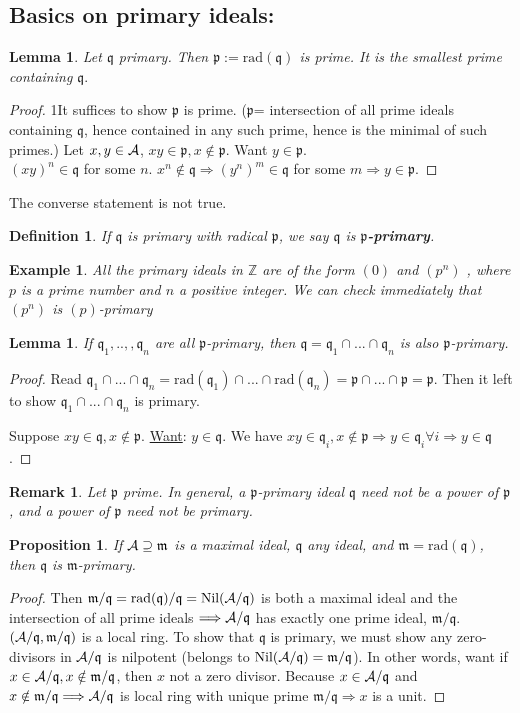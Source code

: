 \documentclass[11pt]{article}
\newtheorem{prop}[thm]{Proposition}
\newtheorem{lemma}[thm]{Lemma}
\newtheorem{dfn}[thm]{Definition}
\newtheorem{rmk}[thm]{Remark}
\newtheorem{ex}[thm]{Example}
\newcommand{\intg}{\mathbb Z}
\newcommand{\scm}{{\mathfrak m}}
\newcommand{\scp}{{\mathfrak p}}
\newcommand{\scq}{\mathfrak q}
\newcommand{\cala}{{\cal A}}
\newcommand{\Lrta}{\Longrightarrow}
\begin{document}
\subsection*{Basics on primary ideals:}
\begin{lemma}
Let $\scq$ primary. Then $\scp:=\text{rad}(\scq)$ is prime. It is the smallest prime containing $\scq.$
\end{lemma}
\begin{proof}
1It suffices to show $\scp$ is prime. ($\scp$= intersection of all prime ideals containing $\scq$, hence contained in any such prime, hence is the minimal of such primes.) Let $x,y\in\cala$, $xy\in\scp,x\notin \scp$. Want $y\in\scp$.\\
 $(xy)^n\in\scq$ for some $n$. $x^n\notin\scq\Lrta (y^n)^m\in\scq $ for some $m$$\Lrta  y\in\scp$.
\end{proof}

The converse statement is not true.
\begin{dfn}
If $\scq$ is primary with radical $\scp$, we say $\scq$ is  \textbf{$\scp$-primary}.
\end{dfn}
\begin{ex}
All the primary ideals in $\intg$ are of the form $(0)$ and $(p^n)$ , where $p$ is a prime number and $n$ a positive integer. We can check immediately that $(p^n)$ is $(p)$-primary
\end{ex}
\begin{lemma}
If $\scq_1,..,,\scq_n$ are all $\scp$-primary, then $\scq=\scq_1\cap...\cap \scq_n$ is also $\scp$-primary.
\end{lemma}
\begin{proof}
Read $\scq_1\cap...\cap\scq_n=\text{rad}(\scq_1)\cap...\cap \text{rad}(\scq_n)=\scp\cap...\cap \scp=\scp$. Then it left to show $\scq_1\cap...\cap\scq_n$ is primary. 

Suppose $xy\in\scq, x\notin \scp$. \underline{Want}: $y\in \scq$. We have $xy\in \scq_i,x\notin\scp\Lrta y\in \scq_i\forall i\Lrta y\in\scq$.
\end{proof}
\begin{rmk}
Let $\scp$ prime. In general, a $\scp$-primary ideal $\scq$ need not be a power of $\scp$, and a power of $\scp$ need not be primary.
\end{rmk}
\begin{prop}\label{lem:rad_maximal_primary}
If $\cala\supseteq\scm$ is a  maximal ideal, $\scq$ any ideal, and $\scm=\text{rad}(\scq)$, then $\scq$ is $\scm$-primary.
\end{prop}
\begin{proof}
Then $\scm/\scq=\text{rad}(\scq)/\scq=\text{Nil}(  \cala/\scq)$ is both a maximal ideal and the intersection of all prime ideals $\Lrta\cala/\scq$ has exactly one prime ideal, $\scm/\scq$. $(\cala/\scq,\scm/\scq)$ is a local ring. To show that $\scq$ is primary, we must show any zero-divisors  in $\cala/\scq$ is nilpotent (belongs to $\text{Nil}(  \cala/\scq)=\scm/\scq$). In other words, want if $x\in\cala/\scq,x\notin\scm/\scq$, then $x$ not a zero divisor. Because $x\in\cala/\scq $ and $ x\notin \scm/\scq\Lrta \cala/\scq $ is local ring with unique prime $\scm/\scq\Lrta x$ is a unit.
\end{proof}
\end{document}
